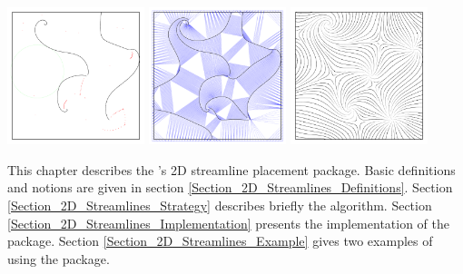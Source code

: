 \newcommand{\streamlinecomment}[1]{}


\begin{ccTexOnly}
\begin{center}
\includegraphics[width=4cm]{Stream_lines_2/1} \hspace*{0.5cm} 
\includegraphics[width=4cm]{Stream_lines_2/2} \hspace*{0.5cm} 
\includegraphics[width=4cm]{Stream_lines_2/3} 
\end{center}
\end{ccTexOnly}


This chapter describes the \cgal's 2D streamline placement package.
Basic definitions and notions are given in section
\ref{Section_2D_Streamlines_Definitions}. Section
\ref{Section_2D_Streamlines_Strategy} describes briefly the algorithm. Section
\ref{Section_2D_Streamlines_Implementation} presents the implementation of the package. Section
\ref{Section_2D_Streamlines_Example} gives two examples of using the package.

